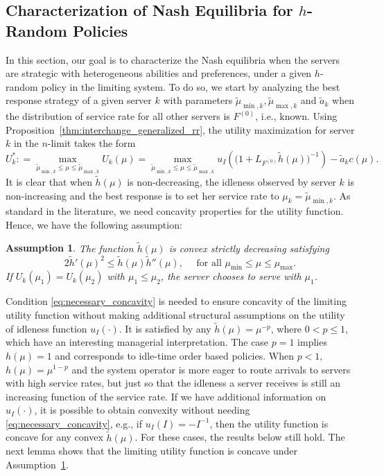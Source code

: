 \documentclass[a4paper,11pt,twoside]{article}
\numberwithin{equation}{section}
\numberwithin{figure}{section}
\theoremstyle{plain}
\newtheorem{assumption}[theorem]{Assumption}
\newcommand{\1}{\mathbbm{1}}
\begin{document}
\subsection[Characterization of Nash Equilibria for h-Random Policies]{Characterization of Nash Equilibria for $h$-Random Policies}\label{sec:strategic_grr}
In this section, our goal is to characterize the Nash equilibria when the servers are strategic with heterogeneous abilities and preferences, under a given $h$-random policy in the limiting system. To do so, we start by analyzing the best response strategy of a given server $k$ with parameters $\tilde{\mu}_{\min,k},\tilde{\mu}_{\max,k}$ and $\tilde{a}_k$ when the distribution of service rate for all other servers is $F^{(0)}$, i.e., known. Using Proposition~\ref{thm:interchange_generalized_rr}, the utility maximization for server $k$ in the $n$-limit takes the form
\begin{equation}\label{eq:best_response_problem}
    U_k^*:
    =\max_{\tilde{\mu}_{\min,k}\leq \mu\leq \tilde{\mu}_{\max,k}} U_k(\mu)
    =\max_{\tilde{\mu}_{\min,k}\leq \mu\leq \tilde{\mu}_{\max,k}} u_I\left(\big(1+L_{F^{(0)}}\tilde{h}(\mu)\big)^{-1}\right)-\tilde{a}_k c(\mu).
\end{equation}
It is clear that when $\tilde{h}(\mu)$ is non-decreasing, the idleness observed by server $k$ is non-increasing and the best response is to set her service rate to $\mu_k=\tilde{\mu}_{\min,k}$. As standard in the literature, we need concavity properties for the utility function. Hence, we have the following assumption:
\begin{assumption}\label{asm:h_convexity}
The function $\tilde{h}(\mu)$ is convex strictly decreasing satisfying  
\begin{equation}
    2\tilde{h}'(\mu)^2\leq \tilde{h}(\mu)\tilde{h}''(\mu),
    \quad \mbox{ for all }\mu_{\min}\leq \mu \leq \mu_{\max}.
    \label{eq:necessary_concavity}
\end{equation}
If $U_k(\mu_1)=U_k(\mu_2)$ with $\mu_1\leq \mu_2$, the server chooses to serve with $\mu_1$.
\end{assumption}

Condition \eqref{eq:necessary_concavity} is needed to ensure concavity of the limiting utility function without making additional structural assumptions on the utility of idleness function $u_I(\cdot)$. It is satisfied by any $\tilde{h}(\mu)=\mu^{-p}$, where $0<p\leq 1$, which have an interesting managerial interpretation. The case $p=1$ implies $h(\mu)=1$ and corresponds to idle-time order based policies. 
When $p<1$, $h(\mu)=\mu^{1-p}$ and the system operator is more eager to route arrivals to servers with high service rates, but just so that the idleness a server receives is still an increasing function of the service rate. If we have additional information on $u_I(\cdot)$, it is possible to obtain convexity without needing \eqref{eq:necessary_concavity}, e.g., if $u_I(I)=-I^{-1}$, then the utility function is concave for any convex $\tilde{h}(\mu)$. For these cases, the results below still hold. The next lemma shows that the limiting utility function is concave under Assumption~\ref{asm:h_convexity}. 
\end{document}

